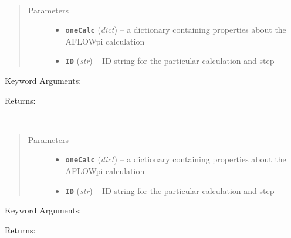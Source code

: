 \documentclass[letterpaper,10pt,english]{sphinxmanual}
\begin{document}

\begin{fulllineitems}
\label{retr:retr.__getConventionalCellFromInput}~\begin{quote}\begin{description}
\item[{Parameters}] \leavevmode\begin{itemize}
\item {} 
\textbf{\texttt{oneCalc}} (\emph{dict}) -- a dictionary containing properties about the AFLOWpi calculation

\item {} 
\textbf{\texttt{ID}} (\emph{str}) -- ID string for the particular calculation and step

\end{itemize}

\end{description}\end{quote}

Keyword Arguments:

Returns:

\end{fulllineitems}


\begin{fulllineitems}
\label{retr:retr.__getConventionalCellFromOutput}~\begin{quote}\begin{description}
\item[{Parameters}] \leavevmode\begin{itemize}
\item {} 
\textbf{\texttt{oneCalc}} (\emph{dict}) -- a dictionary containing properties about the AFLOWpi calculation

\item {} 
\textbf{\texttt{ID}} (\emph{str}) -- ID string for the particular calculation and step

\end{itemize}

\end{description}\end{quote}

Keyword Arguments:

Returns:

\end{fulllineitems}
\end{document}
